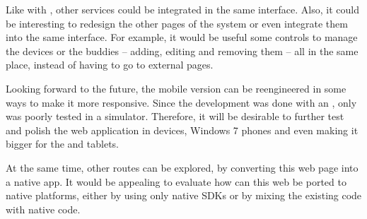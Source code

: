 Like with , other  services could be integrated in the same interface.
Also, it could be interesting to redesign the other pages of the system or even integrate them into the same interface.
For example, it would be useful some controls to manage the devices or the buddies -- adding, editing and removing them -- all in the same place, instead of having to go to external pages.

Looking forward to the future, the mobile version can be reengineered in some ways to make it more responsive.
Since the development was done with an ,  only was poorly tested in a simulator.
Therefore, it will be desirable to further test and polish the web application in  devices, Windows 7 phones and even making it bigger for the  and tablets.

At the same time, other routes can be explored, by converting this web page into a native app.
It would be appealing to evaluate how can this web be ported to native platforms, either by using only native SDKs or by mixing the existing code with native code.
\nicechapterending
